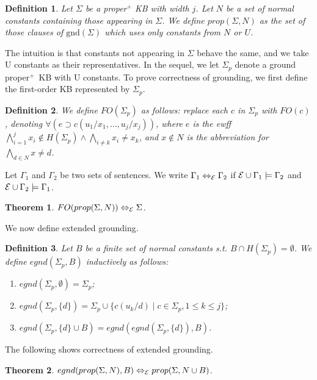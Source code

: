\documentclass[letterpaper]{article}
\newtheorem{THEOREM}{Theorem}
\newenvironment{theorem}{\begin{THEOREM} }%
                        {\end{THEOREM}}
\newtheorem{DEFINITION}{Definition}
\newenvironment{definition}{\begin{DEFINITION} \rm }
                            {\end{DEFINITION}}
\newcommand{\psig}{\Sigma_p}
\newcommand{\properplus}{\mbox{proper$^+$}}
\newcommand{\Eaxiom}{{\M{\cal E}}}
\gdef\M#1{\ifmmode #1\else$#1$\fi}
\newcommand{\gnd}{\mbox{gnd}}
\newcommand{\Eequiv}{\Leftrightarrow_{\Eaxiom}}
\begin{document}
\begin{definition}
Let $\Sigma$ be a proper$^+$ KB with width $j$.
Let $N$ be a set of normal constants containing those appearing in $\Sigma$.
We define $prop(\Sigma, N)$ as the set of those clauses of $\gnd(\Sigma)$ which uses only constants from $N$ or $U$.
\end{definition}

The intuition is that constants not appearing in $\Sigma$ behave the same, and we take U constants as their representatives.
In the sequel, we let $\Sigma_p$ denote a ground \properplus\ KB with U constants. To prove correctness of grounding, we first define the first-order KB represented by $\Sigma_p$.

\begin{definition} We define $FO(\Sigma_p)$ as follows: replace each $c$ in $\Sigma_p$ with $FO(c)$, denoting $\forall (e \supset c(u_1/x_1, \ldots, u_{j}/x_{j}))$, where $e$ is the ewff $\bigwedge^j_{i = 1}x_i\not\in H(\Sigma_p) \wedge \bigwedge_{i \neq k}x_i \neq x_k$, and $x\not \in N$ is the abbreviation for $\bigwedge_{d\in N}x\neq d$.
\end{definition}

Let $\Gamma_1$ and $\Gamma_2$ be two sets of sentences. We write $\Gamma_1 \Eequiv \Gamma_2$ if $\Eaxiom \cup \Gamma_1 \models \Gamma_2$ and $\Eaxiom \cup \Gamma_2 \models \Gamma_1$.


\begin{theorem} \label{gnd-thm} $FO(prop(\Sigma, N)) \Eequiv \Sigma$.
\end{theorem}

We now define extended grounding.

\begin{definition} \label{extend-ground-def}
Let $B$ be a finite set of normal constants s.t. $B \cap H(\psig) = \emptyset$. We define $egnd(\Sigma_p,B)$ inductively as follows:
\begin{enumerate}
\item $egnd(\Sigma_p, \emptyset) = \Sigma_p$;
\item $egnd(\Sigma_p, \{d\}) = \Sigma_p \cup \{c(u_k/d)\mid c\in \Sigma_p, 1\leq k\leq j\}$;
\item $egnd(\Sigma_p, \{d\} \cup B) = egnd(egnd(\Sigma_p, \{d\}), B)$.
\end{enumerate}
\end{definition}

The following shows correctness of extended grounding.

\begin{theorem}\label{egnd-thm}
$egnd(prop(\Sigma, N), B)\Eequiv prop(\Sigma,N\cup B)$.
\end{theorem}
\end{document}
